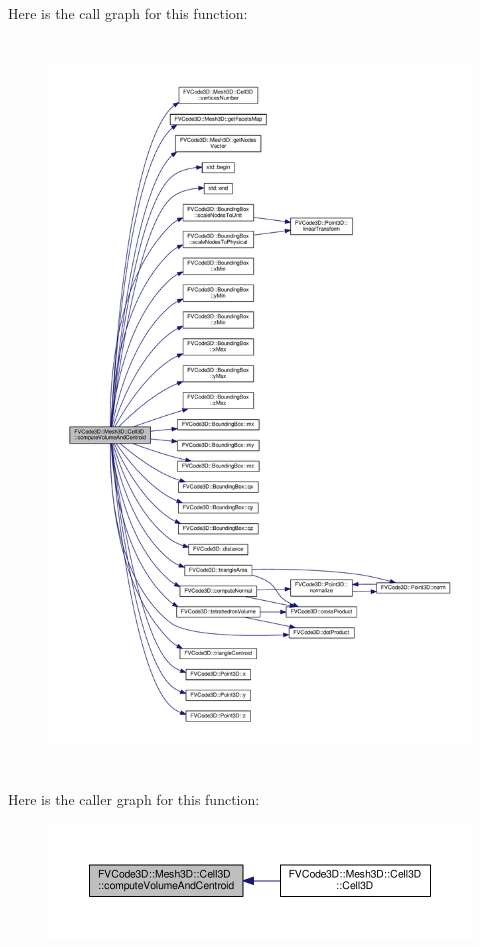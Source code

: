 Here is the call graph for this function\+:
\nopagebreak
\begin{figure}[H]
\begin{center}
\leavevmode
\includegraphics[height=550pt]{classFVCode3D_1_1Mesh3D_1_1Cell3D_ae4ba3b75f888448f83672fcef7d24f2c_cgraph}
\end{center}
\end{figure}




Here is the caller graph for this function\+:
\nopagebreak
\begin{figure}[H]
\begin{center}
\leavevmode
\includegraphics[width=350pt]{classFVCode3D_1_1Mesh3D_1_1Cell3D_ae4ba3b75f888448f83672fcef7d24f2c_icgraph}
\end{center}
\end{figure}


